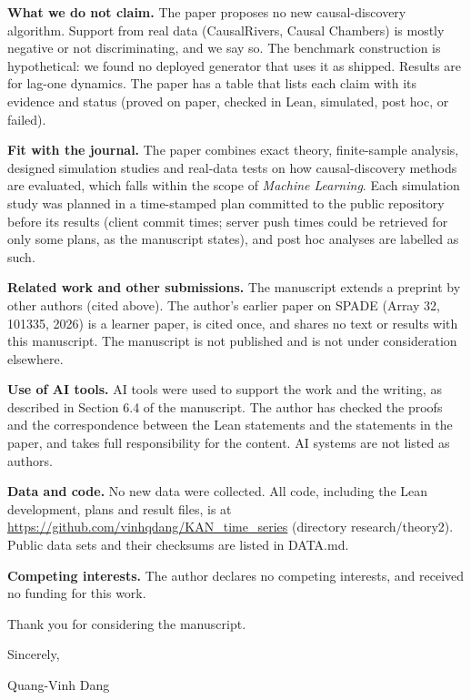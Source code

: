 \documentclass[11pt]{article}
\begin{document}
\textbf{What we do not claim.} The paper proposes no new causal-discovery algorithm. Support from real data (CausalRivers, Causal Chambers) is mostly negative or not discriminating, and we say so. The benchmark construction is hypothetical: we found no deployed generator that uses it as shipped. Results are for lag-one dynamics. The paper has a table that lists each claim with its evidence and status (proved on paper, checked in Lean, simulated, post hoc, or failed).

\textbf{Fit with the journal.} The paper combines exact theory, finite-sample analysis, designed simulation studies and real-data tests on how causal-discovery methods are evaluated, which falls within the scope of \textit{Machine Learning}. Each simulation study was planned in a time-stamped plan committed to the public repository before its results (client commit times; server push times could be retrieved for only some plans, as the manuscript states), and post hoc analyses are labelled as such.

\textbf{Related work and other submissions.} The manuscript extends a preprint by other authors (cited above). The author's earlier paper on SPADE (Array 32, 101335, 2026) is a learner paper, is cited once, and shares no text or results with this manuscript. The manuscript is not published and is not under consideration elsewhere.

\textbf{Use of AI tools.} AI tools were used to support the work and the writing, as described in Section 6.4 of the manuscript. The author has checked the proofs and the correspondence between the Lean statements and the statements in the paper, and takes full responsibility for the content. AI systems are not listed as authors.

\textbf{Data and code.} No new data were collected. All code, including the Lean development, plans and result files, is at \url{https://github.com/vinhqdang/KAN_time_series} (directory research/theory2). Public data sets and their checksums are listed in DATA.md.

\textbf{Competing interests.} The author declares no competing interests, and received no funding for this work.

Thank you for considering the manuscript.

Sincerely,

Quang-Vinh Dang 
\end{document}

